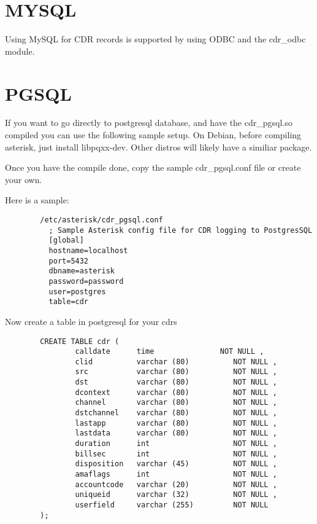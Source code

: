 \section{MYSQL}

Using MySQL for CDR records is supported by using ODBC and the cdr\_odbc module.

\section{PGSQL}
        If you want to go directly to postgresql database, and have the cdr\_pgsql.so
        compiled you can use the following sample setup.
        On Debian, before compiling asterisk, just install libpqxx-dev.
        Other distros will likely have a similiar package.

        Once you have the compile done,
        copy the sample cdr\_pgsql.conf file or create your own.

        Here is a sample:
\begin{verbatim}
        /etc/asterisk/cdr_pgsql.conf
          ; Sample Asterisk config file for CDR logging to PostgresSQL
          [global]
          hostname=localhost
          port=5432
          dbname=asterisk
          password=password
          user=postgres
          table=cdr
\end{verbatim}
        Now create a table in postgresql for your cdrs

\begin{verbatim}
        CREATE TABLE cdr (
                calldate      time               NOT NULL ,
                clid          varchar (80)          NOT NULL ,
                src           varchar (80)          NOT NULL ,
                dst           varchar (80)          NOT NULL ,
                dcontext      varchar (80)          NOT NULL ,
                channel       varchar (80)          NOT NULL ,
                dstchannel    varchar (80)          NOT NULL ,
                lastapp       varchar (80)          NOT NULL ,
                lastdata      varchar (80)          NOT NULL ,
                duration      int                   NOT NULL ,
                billsec       int                   NOT NULL ,
                disposition   varchar (45)          NOT NULL ,
                amaflags      int                   NOT NULL ,
                accountcode   varchar (20)          NOT NULL ,
                uniqueid      varchar (32)          NOT NULL ,
                userfield     varchar (255)         NOT NULL
        );
\end{verbatim}

